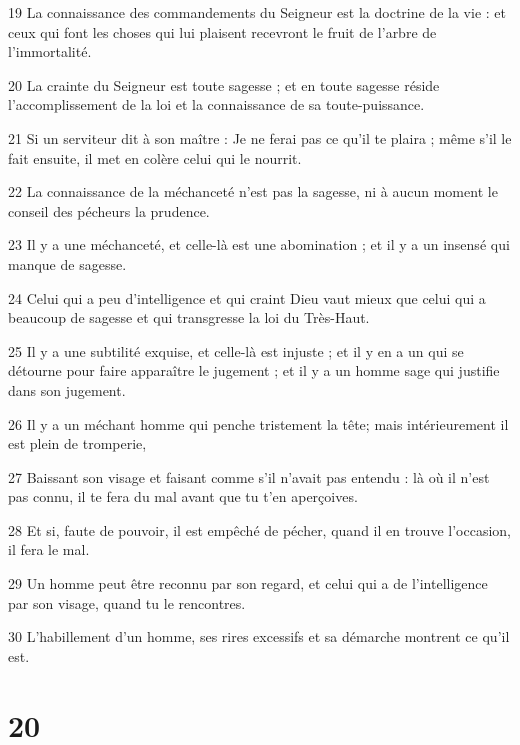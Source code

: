 \par 19 La connaissance des commandements du Seigneur est la doctrine de la vie : et ceux qui font les choses qui lui plaisent recevront le fruit de l'arbre de l'immortalité.
\par 20 La crainte du Seigneur est toute sagesse ; et en toute sagesse réside l'accomplissement de la loi et la connaissance de sa toute-puissance.
\par 21 Si un serviteur dit à son maître : Je ne ferai pas ce qu'il te plaira ; même s'il le fait ensuite, il met en colère celui qui le nourrit.
\par 22 La connaissance de la méchanceté n'est pas la sagesse, ni à aucun moment le conseil des pécheurs la prudence.
\par 23 Il y a une méchanceté, et celle-là est une abomination ; et il y a un insensé qui manque de sagesse.
\par 24 Celui qui a peu d'intelligence et qui craint Dieu vaut mieux que celui qui a beaucoup de sagesse et qui transgresse la loi du Très-Haut.
\par 25 Il y a une subtilité exquise, et celle-là est injuste ; et il y en a un qui se détourne pour faire apparaître le jugement ; et il y a un homme sage qui justifie dans son jugement.
\par 26 Il y a un méchant homme qui penche tristement la tête; mais intérieurement il est plein de tromperie,
\par 27 Baissant son visage et faisant comme s'il n'avait pas entendu : là où il n'est pas connu, il te fera du mal avant que tu t'en aperçoives.
\par 28 Et si, faute de pouvoir, il est empêché de pécher, quand il en trouve l'occasion, il fera le mal.
\par 29 Un homme peut être reconnu par son regard, et celui qui a de l'intelligence par son visage, quand tu le rencontres.
\par 30 L'habillement d'un homme, ses rires excessifs et sa démarche montrent ce qu'il est.

\chapter{20}


